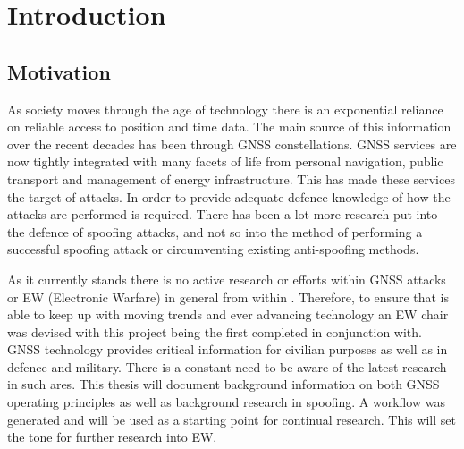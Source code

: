 
\chapter{Introduction}\label{chapter:firstchapter} %

\label{Chapter1} %

\section{Motivation}\label{sec:Motivation}


As society moves through the age of technology there is an exponential reliance on reliable access to position and time data. The main source of this information over the
recent decades has been through GNSS constellations. GNSS services are now tightly integrated with many facets of life from personal navigation, public transport and
management of energy infrastructure. This has made these services the target of attacks. In order to provide adequate defence knowledge of how the attacks are performed is
required. There has been a lot more research put into the defence of spoofing attacks, and not so into the method of performing a successful spoofing attack or
circumventing existing anti-spoofing methods. 

As it currently stands there is no active research or efforts within GNSS attacks or EW (Electronic Warfare) in general from within \univname. Therefore, to ensure that \univname is able to keep up with moving trends and
ever advancing technology an EW chair was devised with this project being the first completed in conjunction with. GNSS technology provides critical information for
civilian purposes as well as in defence and military. There is a constant need to be aware of the latest research in such ares.   
This thesis will document background information on both GNSS operating principles as well as background research in
spoofing. A workflow was generated and will be used as a starting point for continual research. This will set the tone for further research into EW.


